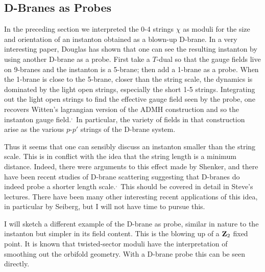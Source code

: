 \subsection{D-Branes as Probes}

In the preceding section we interpreted the 0-4 strings $\chi$ as moduli for the
size and orientation of an instanton obtained as a blown-up D-brane.  In a very
interesting paper, Douglas has shown that one can see the resulting instanton by
using another D-brane as a probe.\cite{dougprobe}  First take a $T$-dual so that
the gauge fields live on 9-branes and the instanton is a 5-brane; then add a
1-brane as a probe.  When the 1-brane is close to the 5-brane, closer than the
string scale, the dynamics is dominated by the light open strings, especially
the short 1-5 strings.  Integrating out the light open strings to find the
effective gauge field seen by the probe, one recovers Witten's lagrangian
version of the ADMH construction and so the
instanton gauge field.\cite{witadmh}$^{\!,\,}$\cite{admh}  In particular, the
variety of fields in that construction arise as the various
$p$-$p'$ strings of the D-brane system.

Thus it seems that one can sensibly discuss an instanton smaller than the
string scale.  This is in conflict with the idea that the
string length is a minimum distance.  Indeed, there were arguments to this
effect made by Shenker,\cite{shenk2} and there have been recent studies of
D-brane scattering suggesting that D-branes do indeed probe a shorter length
scale.\cite{bachas}$^{\!,\,}$\cite{short} This should be covered in detail in
Steve's lectures.  There have been many other interesting recent applications of
this idea, in particular by Seiberg, but I will not have time to pursue this.

I will sketch a different example of the D-brane as probe,\cite{tensors}
similar in nature to the instanton but simpler in its field content.  This is
the blowing up of a ${\bf Z}_2$ fixed point.  It is known that twisted-sector moduli
have the interpretation of smoothing out the orbifold geometry.  With a D-brane
probe this can be seen directly.

